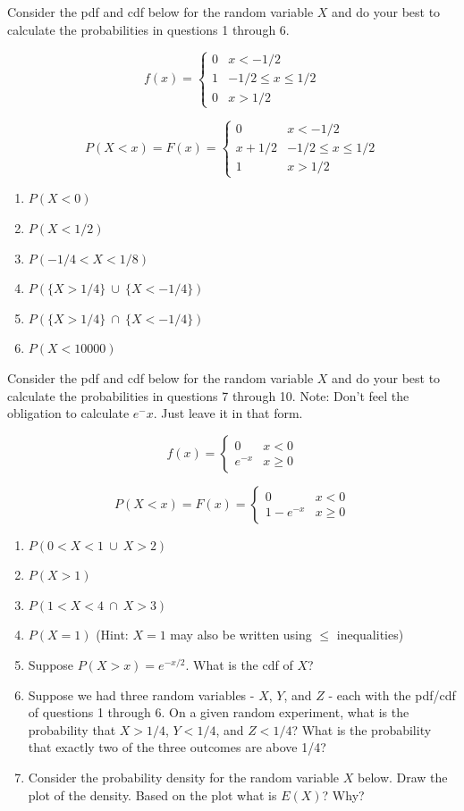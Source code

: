 \documentclass[
]{book}
\theoremstyle{definition}
\theoremstyle{definition}
\theoremstyle{definition}
\theoremstyle{definition}
\theoremstyle{remark}
\begin{document}
Consider the pdf and cdf below for the random variable \(X\) and do your best to calculate the probabilities in questions 1 through 6.

\[
f(x) = \begin{cases}
0 & x < -1/2 \\
1  & -1/2 \leq x \leq 1/2 \\
0 & x > 1/2
\end{cases}
\]

\[
P(X < x) = F(x) = \begin{cases}
0 & x < -1/2 \\
x + 1/2 & -1/2 \leq x \leq 1/2 \\
1 & x > 1/2
\end{cases}
\]

\begin{enumerate}
\def\labelenumi{\arabic{enumi}.}
\item
  \(P(X < 0)\)
\item
  \(P(X < 1/2)\)
\item
  \(P(-1/4 < X < 1/8)\)
\item
  \(P(\{X > 1/4\} \: \cup \: \{X < -1/4\})\)
\item
  \(P(\{X > 1/4\} \: \cap \: \{X < -1/4\})\)
\item
  \(P(X < 10000)\)
\end{enumerate}

Consider the pdf and cdf below for the random variable \(X\) and do your best to calculate the probabilities in questions 7 through 10. Note: Don't feel the obligation to calculate \(e^-x\). Just leave it in that form.

\[
f(x) = \begin{cases}
0 & x < 0 \\
e^{-x} & x \geq 0
\end{cases}
\]

\[
P(X < x) = F(x) = \begin{cases}
0 & x < 0 \\
1-e^{-x} & x \geq 0
\end{cases}
\]

\begin{enumerate}
\def\labelenumi{\arabic{enumi}.}
\setcounter{enumi}{6}
\item
  \(P(0 < X < 1 \: \cup \: X > 2)\)
\item
  \(P(X > 1)\)
\item
  \(P(1 < X < 4 \: \cap \: X > 3)\)
\item
  \(P(X = 1)\) (Hint: \(X = 1\) may also be written using \(\leq\) inequalities)
\item
  Suppose \(P(X > x) = e^{-x/2}\). What is the cdf of \(X\)?
\item
  Suppose we had three random variables - \(X\), \(Y\), and \(Z\) - each with the pdf/cdf of questions 1 through 6. On a given random experiment, what is the probability that \(X > 1/4\), \(Y < 1/4\), and \(Z < 1/4\)? What is the probability that exactly two of the three outcomes are above 1/4?
\item
  Consider the probability density for the random variable \(X\) below. Draw the plot of the density. Based on the plot what is \(E(X)\)? Why?
\end{enumerate}
\end{document}
